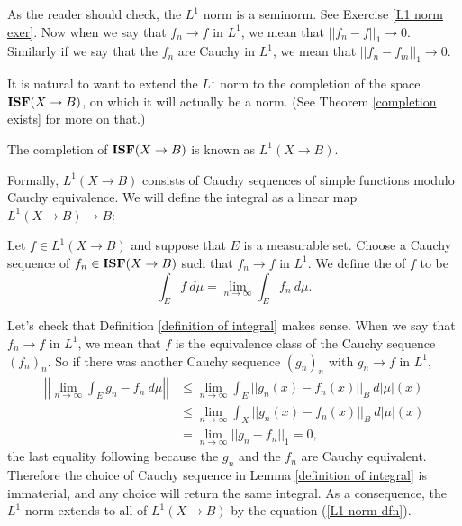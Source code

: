 \begin{subsec}
As the reader should check, the $L^1$ norm is a seminorm. See Exercise \ref{L1 norm exer}.
Now when we say that $f_n \to f$ in $L^1$, we mean that $||f_n - f||_1 \to 0$. Similarly if we say that the $f_n$ are Cauchy in $L^1$, we mean that $||f_n - f_m||_1 \to 0$.
\end{subsec}

\begin{subsec}
It is natural to want to extend the $L^1$ norm to the completion of the space $\mathbf{ISF}(X \to B)$, on which it will actually be a norm.
(See Theorem \ref{completion exists} for more on that.)
\end{subsec}

\begin{definition}
The completion of $\mathbf{ISF}(X \to B)$ is known as $L^1(X \to B)$.
\end{definition}

\begin{subsec}
Formally, $L^1(X \to B)$ consists of Cauchy sequences of simple functions modulo Cauchy equivalence.
We will define the integral as a linear map $L^1(X \to B) \to B$:
\end{subsec}

\begin{definition}
\label{definition of integral}
Let $f \in L^1(X \to B)$ and suppose that $E$ is a measurable set.
Choose a Cauchy sequence of $f_n \in \mathbf{ISF}(X \to B)$ such that $f_n \to f$ in $L^1$.
We define the  of $f$ to be
\[\int_E f~d\mu = \lim_{n \to \infty} \int_E f_n~d\mu.\]
\end{definition}

\begin{subsec}
Let's check that Definition \ref{definition of integral} makes sense. When we say that $f_n \to f$ in $L^1$, we mean that $f$ is the equivalence class of the Cauchy sequence $(f_n)_n$.
So if there was another Cauchy sequence $(g_n)_n$ with $g_n \to f$ in $L^1$,
\begin{align*}\left|\left|\lim_{n \to \infty} \int_E g_n - f_n ~d\mu\right|\right| &\leq \lim_{n \to \infty} \int_E ||g_n(x) - f_n(x)||_B ~d|\mu|(x)\\&
\leq \lim_{n \to \infty} \int_X ||g_n(x) - f_n(x)||_B ~d|\mu|(x)
\\& = \lim_{n \to \infty} ||g_n - f_n||_1 = 0,
\end{align*}
the last equality following because the $g_n$ and the $f_n$ are Cauchy equivalent.
Therefore the choice of Cauchy sequence in Lemma \ref{definition of integral} is immaterial, and any choice will return the same integral.
As a consequence, the $L^1$ norm extends to all of $L^1(X \to B)$ by the equation (\ref{L1 norm dfn}).
\end{subsec}

